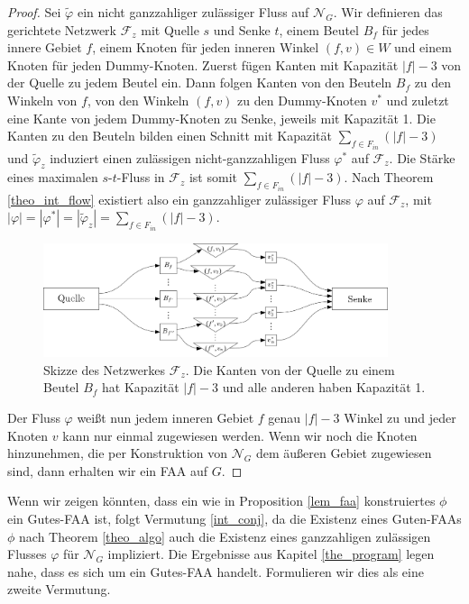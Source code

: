 \begin{proof}
Sei $\tilde{\varphi}$ ein nicht ganzzahliger zulässiger Fluss auf $\mathcal{N}_G$. Wir definieren das gerichtete Netzwerk $\mathcal{F}_z$ mit Quelle $s$ und Senke $t$, einem Beutel $B_f$ für jedes innere Gebiet $f$, einem Knoten für jeden inneren Winkel $(f,v) \in W$ und einem Knoten für jeden Dummy-Knoten. Zuerst fügen Kanten mit Kapazität $|f|-3$ von der Quelle zu jedem Beutel ein. Dann folgen Kanten von den Beuteln $B_f$ zu den Winkeln von $f$, von den Winkeln $(f,v)$ zu den Dummy-Knoten $v^*$ und zuletzt eine Kante von jedem Dummy-Knoten zu Senke, jeweils mit Kapazität 1. Die Kanten zu den Beuteln bilden einen Schnitt mit Kapazität $\sum_{f \in F_{in}}(|f|-3)$ und $\tilde{\varphi}_z$ induziert einen zulässigen nicht-ganzzahligen Fluss $\varphi^*$ auf $\mathcal{F}_z$. Die Stärke eines maximalen $s$-$t$-Fluss in $\mathcal{F}_z$ ist somit $\sum_{f \in F_{in}}(|f|-3)$. Nach Theorem \ref{theo_int_flow} existiert also ein ganzzahliger zulässiger Fluss $\varphi$ auf $\mathcal{F}_z$, mit $|\varphi| = |\varphi^*| = |\tilde{\varphi}_z| = \sum_{f \in F_{in}}(|f|-3).$

\begin{figure}
	\centering
  	\includegraphics[width=0.9\textwidth]{lem_faa_choice.png}
  	\caption{Skizze des Netzwerkes $\mathcal{F}_z$. Die Kanten von der Quelle zu einem Beutel $B_f$ hat Kapazität $|f|-3$ und alle anderen haben Kapazität 1.}
	\label{pic_faa_choice}
\end{figure}

Der Fluss $\varphi$ weißt nun jedem inneren Gebiet $f$ genau $|f|-3$ Winkel zu und jeder Knoten $v$ kann nur einmal zugewiesen werden. Wenn wir noch die Knoten hinzunehmen, die per Konstruktion von $\mathcal{N}_G$ dem äußeren Gebiet zugewiesen sind, dann erhalten wir ein FAA auf $G$.
\end{proof}

Wenn wir zeigen könnten, dass ein wie in Proposition \ref{lem_faa} konstruiertes $\phi$ ein Gutes-FAA ist, folgt Vermutung \ref{int_conj}, da die Existenz eines Guten-FAAs $\phi$ nach Theorem \ref{theo_algo} auch die Existenz eines ganzzahligen zulässigen Flusses $\varphi$ für $\mathcal{N}_G$ impliziert. Die Ergebnisse aus Kapitel \ref{the_program} legen nahe, dass es sich um ein Gutes-FAA handelt. Formulieren wir dies als eine zweite Vermutung.

